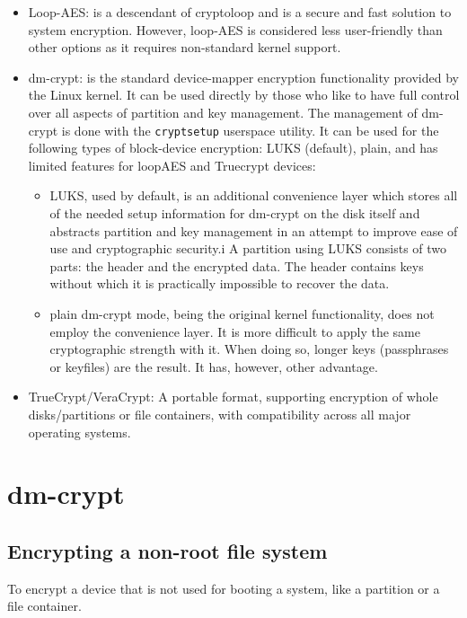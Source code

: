 \begin{itemize}
    \item Loop-AES:  is a descendant of cryptoloop and is a secure and fast
            solution to system encryption. However, loop-AES is considered less
            user-friendly than other options as it requires non-standard kernel
            support.

    \item dm-crypt:  is the standard device-mapper encryption functionality
        provided by the Linux kernel. It can be used directly by those who like
        to have full control over all aspects of partition and key management.
        The management of dm-crypt is done with the \verb+cryptsetup+ userspace
        utility. It can be used for the following types of block-device
        encryption: LUKS (default), plain, and has limited features for loopAES
        and Truecrypt devices: 
        \begin{itemize}
            \item LUKS, used by default, is an additional convenience layer
                which stores all of the needed setup information for dm-crypt
                on the disk itself and abstracts partition and key management
                in an attempt to improve ease of use and cryptographic
                security.i A partition using LUKS consists of two parts: the
                header and the encrypted data. The header contains keys without
                which it is practically impossible to recover the data.
            \item plain dm-crypt mode, being the original kernel functionality,
                does not employ the convenience layer. It is more difficult to
                apply the same cryptographic strength with it. When doing so,
                longer keys (passphrases or keyfiles) are the result. It has,
                however, other advantage. 
        \end{itemize}
    \item  TrueCrypt/VeraCrypt: A portable format, supporting encryption of
        whole disks/partitions or file containers, with compatibility across
        all major operating systems.
\end{itemize}


\section{dm-crypt}

\subsection{Encrypting a non-root file system}
To encrypt a device that is not used for booting a system, like a partition or a file container.

